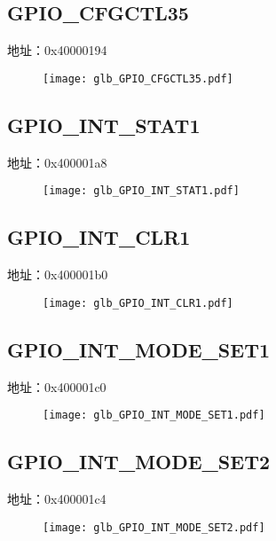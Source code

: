 \subsection{GPIO\_CFGCTL35}
\label{glb-GPIO-CFGCTL35}
地址：0x40000194
 \begin{figure}[H]
\texttt{[image: glb\_GPIO\_CFGCTL35.pdf]}
\end{figure}

\subsection{GPIO\_INT\_STAT1}
\label{glb-GPIO-INT-STAT1}
地址：0x400001a8
 \begin{figure}[H]
\texttt{[image: glb\_GPIO\_INT\_STAT1.pdf]}
\end{figure}

\subsection{GPIO\_INT\_CLR1}
\label{glb-GPIO-INT-CLR1}
地址：0x400001b0
 \begin{figure}[H]
\texttt{[image: glb\_GPIO\_INT\_CLR1.pdf]}
\end{figure}

\subsection{GPIO\_INT\_MODE\_SET1}
\label{glb-GPIO-INT-MODE-SET1}
地址：0x400001c0
 \begin{figure}[H]
\texttt{[image: glb\_GPIO\_INT\_MODE\_SET1.pdf]}
\end{figure}

\subsection{GPIO\_INT\_MODE\_SET2}
\label{glb-GPIO-INT-MODE-SET2}
地址：0x400001c4
 \begin{figure}[H]
\texttt{[image: glb\_GPIO\_INT\_MODE\_SET2.pdf]}
\end{figure}

